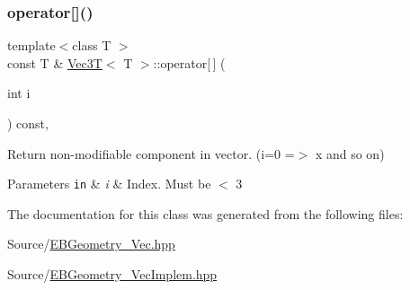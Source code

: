 \subsubsection{\texorpdfstring{operator[]()}{operator[]()}\hspace{0.1cm}{\footnotesize\ttfamily [2/2]}}
{\footnotesize\ttfamily template$<$class T $>$ \\
const T \& \hyperlink{classVec3T}{Vec3T}$<$ T $>$\+::operator\mbox{[}$\,$\mbox{]} (\begin{DoxyParamCaption}\item[{int}]{i }\end{DoxyParamCaption}) const\hspace{0.3cm}{\ttfamily [inline]}, {\ttfamily [noexcept]}}



Return non-\/modifiable component in vector. (i=0 =$>$ x and so on) 


\begin{DoxyParams}[1]{Parameters}
\mbox{\tt in}  & {\em i} & Index. Must be $<$ 3 \\
\hline
\end{DoxyParams}


The documentation for this class was generated from the following files\+:\begin{DoxyCompactItemize}
\item 
Source/\hyperlink{EBGeometry__Vec_8hpp}{E\+B\+Geometry\+\_\+\+Vec.\+hpp}\item 
Source/\hyperlink{EBGeometry__VecImplem_8hpp}{E\+B\+Geometry\+\_\+\+Vec\+Implem.\+hpp}\end{DoxyCompactItemize}
